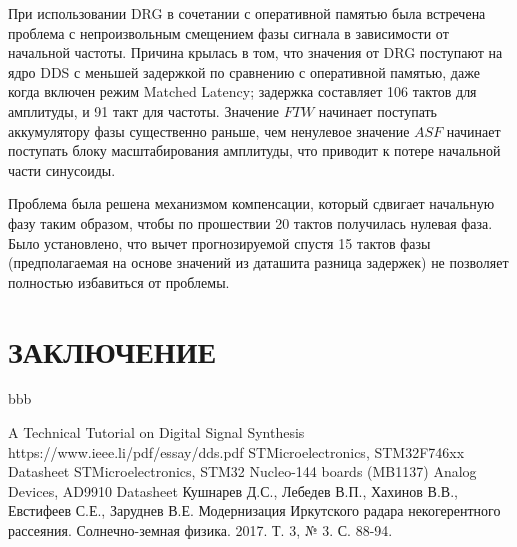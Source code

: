 \documentclass[rusmathsym, eqnumwithinsec, amspack, hyperref]{bomgost}
\begin{document}
При использовании DRG в сочетании с оперативной памятью была встречена проблема с непроизвольным смещением фазы сигнала в зависимости от начальной частоты. Причина крылась в том, что значения от DRG поступают на ядро DDS с меньшей задержкой по сравнению с оперативной памятью, даже когда включен режим Matched Latency; задержка составляет 106 тактов для амплитуды, и 91 такт для частоты. Значение $FTW$ начинает поступать аккумулятору фазы существенно раньше, чем ненулевое значение $ASF$ начинает поступать блоку масштабирования амплитуды, что приводит к потере начальной части синусоиды.

Проблема была решена механизмом компенсации, который сдвигает начальную фазу таким образом, чтобы по прошествии 20 тактов получилась нулевая фаза. Было установлено, что вычет прогнозируемой спустя 15 тактов фазы (предполагаемая на основе значений из даташита разница задержек) не позволяет полностью избавиться от проблемы.

\section*{ЗАКЛЮЧЕНИЕ}
bbb

\begin{thebibliography}{11}
 A Technical Tutorial
on Digital Signal Synthesis https://www.ieee.li/pdf/essay/dds.pdf
 STMicroelectronics, STM32F746xx Datasheet
 STMicroelectronics, STM32 Nucleo-144 boards (MB1137)
 Analog Devices, AD9910 Datasheet
 Кушнарев Д.С., Лебедев В.П., Хахинов В.В., Евстифеев С.Е., Заруднев В.Е. Модернизация Иркутского радара некогерентного рассеяния. Солнечно-земная физика. 2017. Т. 3, № 3. С. 88-94.
\end{thebibliography}

\appendix
\end{document}
